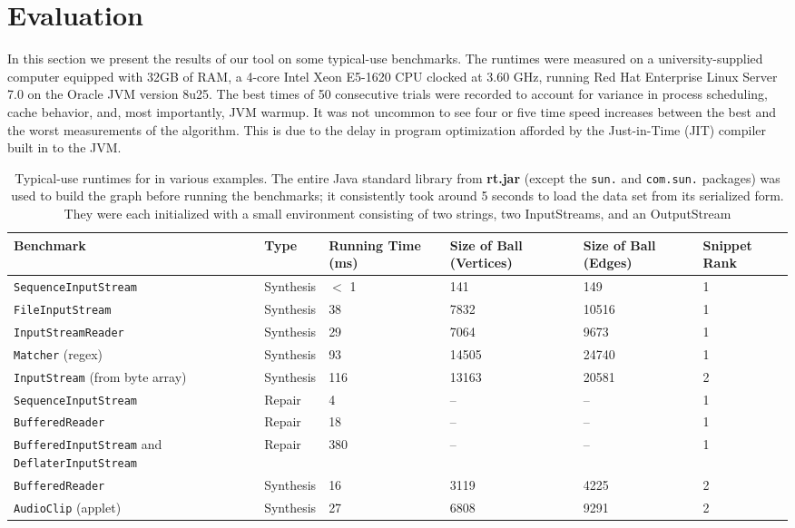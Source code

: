 \section{Evaluation}
\label{sec:evaluation}

In this section we present the results of our tool on some typical-use benchmarks. The runtimes were measured on a university-supplied computer equipped with 32GB of RAM, a 4-core Intel Xeon E5-1620 CPU clocked at 3.60 GHz, running Red Hat Enterprise Linux Server 7.0 on the Oracle JVM version 8u25. The best times of 50 consecutive trials were recorded to account for variance in process scheduling, cache behavior, and, most importantly, JVM warmup. It was not uncommon to see four or five time speed increases between the best and the worst measurements of the algorithm. This is due to the delay in program optimization afforded by the Just-in-Time (JIT) compiler built in to the JVM.

\begin{table*}[t]
  \centering
  \renewcommand{\arraystretch}{1.25}
  \begin{tabularx}{\textwidth}{| X | l | l | l | l | l |}
    \hline
    \textbf{Benchmark} & \textbf{Type} & \textbf{Running Time (ms)} & \textbf{Size of Ball (Vertices)} & \textbf{Size of Ball (Edges)} & \textbf{Snippet Rank} \\ \hline
	\texttt{SequenceInputStream} & Synthesis & $<$ 1 & 141   & 149   & 1 \\ \hline
    \texttt{FileInputStream}     & Synthesis & 38  & 7832  & 10516 & 1 \\ \hline
    \texttt{InputStreamReader}   & Synthesis & 29  & 7064  & 9673  & 1 \\ \hline
    \texttt{Matcher} (regex)     & Synthesis & 93  & 14505 & 24740 & 1 \\ \hline
    \texttt{InputStream} (from byte array) & Synthesis & 116 & 13163  & 20581  & 2 \\ \hline
    \texttt{SequenceInputStream} & Repair    & 4   & --    & --    & 1 \\ \hline
    \texttt{BufferedReader}      & Repair    & 18  & --    & --    & 1 \\ \hline
    \texttt{BufferedInputStream} and \texttt{DeflaterInputStream}  & Repair & 380 & -- & -- & 1 \\ \hline
    \texttt{BufferedReader}      & Synthesis & 16  & 3119  & 4225  & 2 \\ \hline
    \texttt{AudioClip} (applet)  & Synthesis & 27  & 6808  & 9291  & 2 \\ \hline
  \end{tabularx}
  \caption{Typical-use runtimes for \ourTool in various examples. The entire Java standard library from \textbf{rt.jar} (except the \texttt{sun.} and \texttt{com.sun.} packages) was used to build the graph before running the benchmarks; it consistently took around 5 seconds to load the data set from its serialized form. They were each initialized with a small environment consisting of two strings, two InputStreams, and an OutputStream}
  \label{eval:runtime}
\end{table*}

